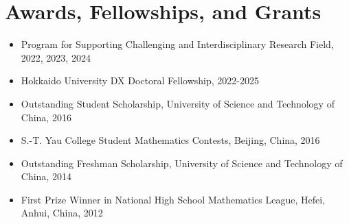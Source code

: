 \documentclass[a4paper,11pt]{article}
\begin{document}
\section*{Awards, Fellowships, and Grants}
\begin{itemize}
    \item Program for Supporting Challenging and Interdisciplinary Research Field, 2022, 2023, 2024
    \item Hokkaido University DX Doctoral Fellowship, 2022-2025
    \item Outstanding Student Scholarship, University of Science and Technology of China, 2016
    \item S.-T. Yau College Student Mathematics Contests, Beijing, China, 2016
    \item Outstanding Freshman Scholarship, University of Science and Technology of China, 2014
    \item First Prize Winner in National High School Mathematics League, Hefei, Anhui, China, 2012
\end{itemize}
\end{document}
